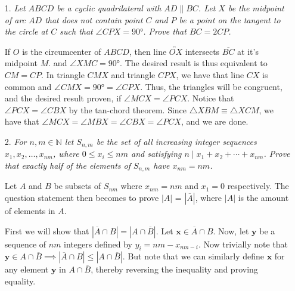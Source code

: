 \documentclass{article}
\begin{document}
\begin{enumerate}

\medskip
\item[1.] %
\textit{Let $ABCD$ be a cyclic quadrilateral with $AD \parallel BC$. Let $X$ be the midpoint of arc $AD$ that does not contain point $C$ and $P$ be a point on the tangent to the circle at $C$ such that $\angle CPX = 90 \si{\degree} $. Prove that $BC = 2 CP$.}

If $O$ is the circumcenter of $ABCD$, then line $\overleftrightarrow{OX}$ intersects $\overline{BC}$ at it's midpoint $M$. and $\angle XMC = 90 \si{\degree}$. The desired result is thus equivalent to $CM = CP$. In triangle $CMX$ and triangle $CPX$, we have that line $CX$ is common and $\angle CMX = 90 \si{\degree} = \angle CPX$. Thus, the triangles will be congruent, and the desired result proven, if $\angle MCX = \angle PCX$. Notice that $\angle PCX = \angle CBX$ by the tan-chord theorem. Since $\triangle XBM \equiv \triangle XCM$, we have that $\angle MCX = \angle MBX = \angle CBX = \angle PCX$, and we are done.


\medskip
\item[2.] %
\textit{For $n,m\in\mathbb{N}$ let $S_{n,m}$ be the set of all increasing integer sequences $x_{1},x_{2},\ldots,x_{nm}$, where $0\leq x_i\leq nm$ and satisfying $n \mid x_{1} + x_{2} + \cdots +x_{nm}$. Prove that exactly half of the elements of $S_{n,m}$ have $x_{nm}=nm$.}

Let $A$ and $B$ be subsets of $S_{nm}$ where $x_{nm} = nm$ and $x_1 = 0$ respectively. The question statement then becomes to prove $|A|$ = $|\overline{A}|$, where $|A|$ is the amount of elements in $A$.

First we will show that $|\overline{A}\cap B| = |A\cap\overline{B}|$. 
Let $\mathbf{x} \in \overline{A}\cap B$. Now, let $\mathbf{y}$ be a sequence of $nm$ integers defined by $y_i = nm - x_{nm-i}$. Now trivially note that $\mathbf{y} \in A\cap\overline{B} \implies |\overline{A}\cap B| \leq |A\cap\overline{B}|$. But note that we can similarly define $\mathbf{x}$ for any element $\mathbf{y}$ in $A\cap\overline{B}$, thereby reversing the inequality and proving equality. 


\end{enumerate}
\end{document}
